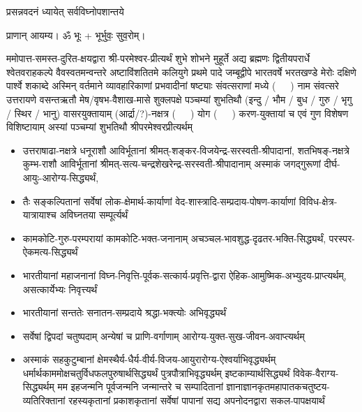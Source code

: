 
\setlength{\parindent}{0pt}




{प्रसन्नवदनं ध्यायेत् सर्वविघ्नोपशान्तये}
 
प्राणान्  आयम्य।  ॐ भूः + भूर्भुवः॒ सुव॒रोम्।


ममोपात्त-समस्त-दुरित-क्षयद्वारा श्री-परमेश्वर-प्रीत्यर्थं शुभे शोभने मुहूर्ते अद्य ब्रह्मणः
द्वितीयपरार्धे श्वेतवराहकल्पे वैवस्वतमन्वन्तरे अष्टाविंशतितमे कलियुगे प्रथमे पादे
जम्बूद्वीपे भारतवर्षे भरतखण्डे मेरोः दक्षिणे पार्श्वे शकाब्दे अस्मिन् वर्तमाने व्यावहारिकाणां प्रभवादीनां षष्ट्याः संवत्सराणां मध्ये \mbox{(~~~)} नाम संवत्सरे उत्तरायणे
वसन्तऋतौ  मेष/वृषभ-वैशाख-मासे शुक्लपक्षे पञ्चम्यां शुभतिथौ
(इन्दु / भौम / बुध / गुरु / भृगु / स्थिर / भानु) वासरयुक्तायाम्
(आर्द्रा/?)-नक्षत्र \mbox{(~~~)} योग  \mbox{(~~~)} करण-युक्तायां च एवं गुण विशेषण विशिष्टायाम्
अस्यां पञ्चम्यां  
शुभतिथौ श्रीपरमेश्वरप्रीत्यर्थम्

\begin{itemize}
\item उत्तराषाढा-नक्षत्रे धनूराशौ आविर्भू\-तानां श्रीमत्-शङ्कर-विजयेन्द्र-सरस्वती-श्रीपादानां, शतभिषङ्-नक्षत्रे कुम्भ-राशौ आविर्भूतानां श्रीमत्-सत्य-चन्द्रशेखरेन्द्र-सरस्वती-श्रीपादानाम् अस्माकं जगद्गुरूणां दीर्घ-आयुः-आरोग्य-सिद्ध्यर्थं,

\item तैः सङ्कल्पितानां सर्वेषां लोक-क्षेमार्थ-कार्याणां वेद-शास्त्रादि-सम्प्रदाय-पोषण-कार्याणां विविध-क्षेत्र-यात्रायाश्च अविघ्नतया सम्पूर्त्यर्थं

\item कामकोटि-गुरु-परम्परायां कामकोटि-भक्त-जनानाम् अचञ्चल-भावशुद्ध-दृढतर-भक्ति-सिद्ध्यर्थं, परस्पर-ऐकमत्य-सिद्ध्यर्थं

\item भारतीयानां महाजनानां विघ्न-निवृत्ति-पूर्वक-सत्कार्य-प्रवृत्ति-द्वारा ऐहिक-आमुष्मिक-अभ्युदय-प्राप्त्यर्थम्, असत्कार्येभ्यः निवृत्त्यर्थं

\item भारतीयानां सन्ततेः सनातन-सम्प्रदाये श्रद्धा-भक्त्योः अभिवृद्ध्यर्थं

\item सर्वेषां द्विपदां चतुष्पदाम् अन्येषां च प्राणि-वर्गाणाम् आरोग्य-युक्त-सुख-जीवन-अवाप्त्यर्थम्

\item अस्माकं सहकुटुम्बानां क्षेमस्थैर्य-धैर्य-वीर्य-विजय-आयुरारोग्य-ऐश्वर्याभिवृद्ध्यर्थम्
 धर्मार्थकाममोक्ष\-चतुर्विधफलपुरुषार्थसिद्ध्यर्थं पुत्रपौत्राभि\-वृद्ध्यर्थम् इष्टकाम्यार्थसिद्ध्यर्थं विवेक-वैराग्य-सिद्ध्यर्थम्
मम इहजन्मनि पूर्वजन्मनि जन्मान्तरे च सम्पादितानां ज्ञानाज्ञानकृतमहा\-पातकचतुष्टय-व्यतिरिक्तानां रहस्यकृतानां प्रकाशकृतानां सर्वेषां पापानां सद्य अपनोदनद्वारा सकल-पापक्षयार्थं 

\end{itemize}

